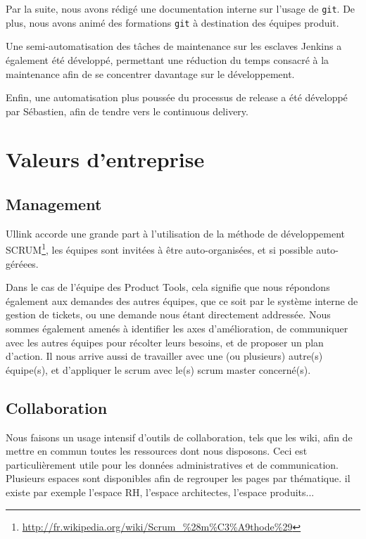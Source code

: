 \documentclass[a4paper, 12pt]{article}
\newcommand{\git}{\texttt{git}}
\begin{document}
Par la suite, nous avons rédigé une documentation interne sur l'usage de \git. De plus, nous avons animé des formations \texttt{git} à destination des équipes produit.

Une semi-automatisation des tâches de maintenance sur les esclaves Jenkins a également été développé, permettant une réduction du temps consacré à la maintenance afin de se concentrer davantage sur le développement.

Enfin, une automatisation plus poussée du processus de release a été développé par Sébastien, afin de tendre vers le continuous delivery.

\section{Valeurs d'entreprise}

\subsection{Management}

Ullink accorde une grande part à l'utilisation de la méthode de développement SCRUM\footnote{\url{http://fr.wikipedia.org/wiki/Scrum_\%28m\%C3\%A9thode\%29}}, les équipes sont invitées à être auto-organisées, et si possible auto-géréees.

Dans le cas de l'équipe des Product Tools, cela signifie que nous répondons également aux demandes des autres équipes, que ce soit par le système interne de gestion de tickets, ou une demande nous étant directement addressée. Nous sommes également amenés à identifier les axes d'amélioration, de communiquer avec les autres équipes pour récolter leurs besoins, et de proposer un plan d'action. Il nous arrive aussi de travailler avec une (ou plusieurs) autre(s) équipe(s), et d'appliquer le scrum avec le(s) scrum master concerné(s).

\subsection{Collaboration}

Nous faisons un usage intensif d'outils de collaboration, tels que les wiki, afin de mettre en commun toutes les ressources dont nous disposons. Ceci est particulièrement utile pour les données administratives et de communication. Plusieurs espaces sont disponibles afin de regrouper les pages par thématique. il existe par exemple l'espace RH, l'espace architectes, l'espace produits...
\end{document}
